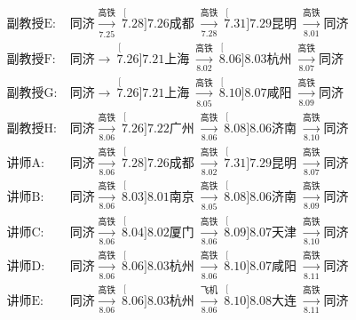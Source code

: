 \documentclass[a4paper,12pt]{ctexart}
\newcommand{\CityII}  {\stackrel[7.26]{7.21}{\text{上海}}}
\newcommand{\CityIII} {\stackrel[7.26]{7.22}{\text{广州}}}
\newcommand{\CityV}   {\stackrel[7.28]{7.26}{\text{成都}}}
\newcommand{\CityVI}  {\stackrel[7.31]{7.29}{\text{昆明}}}
\newcommand{\CityVII} {\stackrel[8.03]{8.01}{\text{南京}}}
\newcommand{\CityVIII}{\stackrel[8.04]{8.02}{\text{厦门}}}
\newcommand{\CityIX}  {\stackrel[8.06]{8.03}{\text{杭州}}}
\newcommand{\CityX}   {\stackrel[8.08]{8.06}{\text{济南}}}
\newcommand{\CityXI}  {\stackrel[8.09]{8.07}{\text{天津}}}
\newcommand{\CityXII} {\stackrel[8.10]{8.07}{\text{咸阳}}}
\newcommand{\CityXIII}{\stackrel[8.10]{8.08}{\text{大连}}}
\begin{document}
\begin{scriptsize}
\begin{align*}
            \text{副教授E:}&\ \textit{同济}
                \xrightarrow[7.25]{\text{高铁}}\ \CityV\
                \xrightarrow[7.28]{\text{高铁}}\ \CityVI\
                \xrightarrow[8.01]{\text{高铁}} \textit{同济}\\
            \text{副教授F:}&\ \textit{同济}
                \xrightarrow{\hspace{13pt}}\ \CityII\
                \xrightarrow[8.02]{\text{高铁}}\ \CityIX\
                \xrightarrow[8.07]{\text{高铁}} \textit{同济}\\
            \text{副教授G:}&\ \textit{同济}
                \xrightarrow{\hspace{13pt}}\ \CityII\
                \xrightarrow[8.05]{\text{高铁}}\ \CityXII\
                \xrightarrow[8.09]{\text{高铁}} \textit{同济}\\
            \text{副教授H:}&\ \textit{同济}
                \xrightarrow[8.06]{\text{高铁}}\ \CityIII\
                \xrightarrow[8.06]{\text{高铁}}\ \CityX\
                \xrightarrow[8.10]{\text{高铁}} \textit{同济}\\
            \text{讲师A:}&\ \textit{同济}
                \xrightarrow[8.06]{\text{高铁}}\ \CityV\
                \xrightarrow[8.02]{\text{高铁}}\ \CityVI\
                \xrightarrow[8.07]{\text{高铁}} \textit{同济}\\
            \text{讲师B:}&\ \textit{同济}
                \xrightarrow[8.06]{\text{高铁}}\ \CityVII\
                \xrightarrow[8.05]{\text{高铁}}\ \CityX\
                \xrightarrow[8.09]{\text{高铁}} \textit{同济}\\
            \text{讲师C:}&\ \textit{同济}
                \xrightarrow[8.06]{\text{高铁}}\ \CityVIII\
                \xrightarrow[8.06]{\text{高铁}}\ \CityXI\
                \xrightarrow[8.10]{\text{高铁}} \textit{同济}\\
            \text{讲师D:}&\ \textit{同济}
                \xrightarrow[8.06]{\text{高铁}}\ \CityIX\
                \xrightarrow[8.06]{\text{高铁}}\ \CityXII\
                \xrightarrow[8.11]{\text{高铁}} \textit{同济}\\
            \text{讲师E:}&\ \textit{同济}
                \xrightarrow[8.06]{\text{高铁}}\ \CityIX\
                \xrightarrow[8.06]{\text{飞机}}\ \CityXIII\
                \xrightarrow[8.11]{\text{高铁}} \textit{同济}\\
        \end{align*}
    \end{scriptsize}
\end{document}
